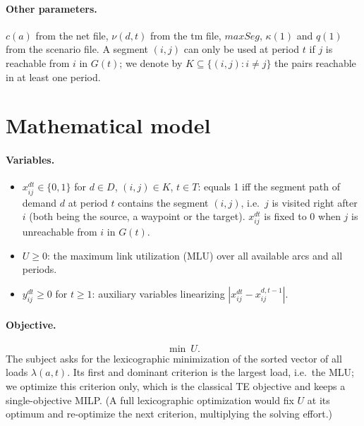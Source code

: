 \documentclass[11pt,a4paper]{article}
\begin{document}
\paragraph{Other parameters.} $c(a)$ from the net file, $\nu(d,t)$ from the tm file, $maxSeg$, $\kappa(1)$
and $q(1)$ from the scenario file. A segment $(i,j)$ can only be used at period $t$ if $j$ is reachable
from $i$ in $G(t)$; we denote by $K\subseteq\{(i,j):i\neq j\}$ the pairs reachable in at least one period.

\section{Mathematical model}

\paragraph{Variables.}
\begin{itemize}
\item $x^{dt}_{ij}\in\{0,1\}$ for $d\in D$, $(i,j)\in K$, $t\in T$: equals 1 iff the segment path of
demand $d$ at period $t$ contains the segment $(i,j)$, i.e.\ $j$ is visited right after $i$ (both being
the source, a waypoint or the target). $x^{dt}_{ij}$ is fixed to 0 when $j$ is unreachable from $i$ in $G(t)$.
\item $U\geq0$: the maximum link utilization (MLU) over all available arcs and all periods.
\item $y^{dt}_{ij}\geq0$ for $t\geq1$: auxiliary variables linearizing $|x^{dt}_{ij}-x^{d,t-1}_{ij}|$.
\end{itemize}

\paragraph{Objective.}
\[
\min\ U .
\]
The subject asks for the lexicographic minimization of the sorted vector of all loads
$\lambda(a,t)$. Its first and dominant criterion is the largest load, i.e.\ the MLU; we optimize this
criterion only, which is the classical TE objective and keeps a single-objective MILP. (A full lexicographic
optimization would fix $U$ at its optimum and re-optimize the next criterion, multiplying the solving effort.)
\end{document}
